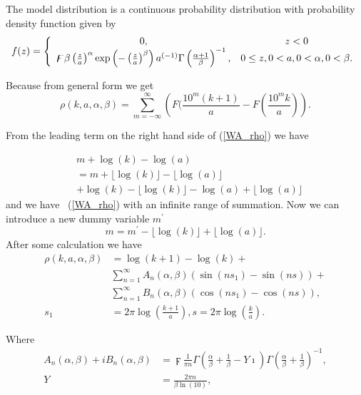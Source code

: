 \documentclass[titlepage,fleqn]{article}%
\begin{document}
The model distribution is a continuous probability distribution with
probability density function given by%
\begin{equation}
f(z)=\left\{
\begin{array}
[c]{cc}%
0, & z<0\\
\digamma\beta\left(  \frac{z}{a}\right)  ^{\alpha}\exp\left(  -\left(
\frac{z}{a}\right)  ^{\beta}\right)  a^{(-1)}\Gamma\left(  \frac{\alpha
+1}{\beta}\right)  ^{-1}, & 0\leq z,0<a,0<\alpha,0<\beta.
\end{array}
\right.  \label{defWD}%
\end{equation}


Because from general form we get
\begin{equation}
\rho(k,a,\alpha,\beta)=%
{\displaystyle\sum\limits_{m=-\infty}^{\infty}}
\left(  F(\frac{10^{m}(k+1)}{a}-F\left(  \frac{10^{m}k}{a}\right)  \right)  .
\label{WA_rho}%
\end{equation}


From the leading term on the right hand side of (\ref{WA_rho}) we have%

\begin{align*}
&  m+\log(k)-\log(a)\\
&  =m+\lfloor\log(k)\rfloor-\lfloor\log(a)\rfloor\\
&  +\log(k)-\lfloor\log(k)\rfloor-\log(a)+\lfloor\log(a)\rfloor
\end{align*}
and we have \ (\ref{WA_rho}) with an infinite range of summation. Now we can
introduce a new dummy variable $m^{\prime}$
\[
m=m^{\prime}-\lfloor\log(k)\rfloor+\lfloor\log(a)\rfloor.
\]
After some calculation we have%
\begin{align*}
\rho(k,a,\alpha,\beta)  &  =\log(k+1)-\log(k)+\\
&
{\displaystyle\sum\limits_{n=1}^{\infty}}
A_{n}(\alpha,\beta)\left(  \sin\left(  ns_{1}\right)  -\sin\left(  ns\right)
\right)  +\\
&
{\displaystyle\sum\limits_{n=1}^{\infty}}
B_{n}(\alpha,\beta)\left(  \cos\left(  ns_{1}\right)  -\cos\left(  ns\right)
\right)  ,\\
s_{1}  &  =2\pi\log\left(  \frac{k+1}{a}\right)  ,s=2\pi\log\left(  \frac
{k}{a}\right)  .
\end{align*}
\bigskip

Where%
\begin{align}
A_{n}(\alpha,\beta)+iB_{n}(\alpha,\beta)  &  =\digamma\frac{1}{\pi n}%
\Gamma\left(  \frac{\alpha}{\beta}+\frac{1}{\beta}-Y\imath\right)
\Gamma\left(  \frac{\alpha}{\beta}+\frac{1}{\beta}\right)  ^{-1},\\
Y  &  =\frac{2\pi n}{\beta\ln(10)},
\end{align}
\end{document}
